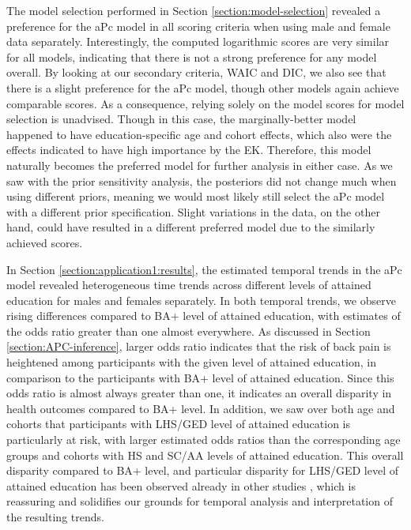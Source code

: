 \vspace{-0.2cm}
The model selection performed in Section \ref{section:model-selection} revealed a preference for the aPc model in all scoring criteria when using male and female data separately. Interestingly, the computed logarithmic scores are very similar for all models, indicating that there is not a strong preference for any model overall. By looking at our secondary criteria, WAIC and DIC, we also see that there is a slight preference for the aPc model, though other models again achieve comparable scores. As a consequence, relying solely on the model scores for model selection is unadvised. Though in this case, the marginally-better model happened to have education-specific age and cohort effects, which also were the effects indicated to have high importance by the EK. Therefore, this model naturally becomes the preferred model for further analysis in either case. As we saw with the prior sensitivity analysis, the posteriors did not change much when using different priors, meaning we would most likely still select the aPc model with a different prior specification. Slight variations in the data, on the other hand, could have resulted in a different preferred model due to the similarly achieved scores. 

\vspace{-0.2cm}
In Section \ref{section:application1:results}, the estimated temporal trends in the aPc model revealed heterogeneous time trends across different levels of attained education for males and females separately. In both temporal trends, we observe rising differences compared to BA+ level of attained education, with estimates of the odds ratio greater than one almost everywhere. As discussed in Section \ref{section:APC-inference}, larger odds ratio indicates that the risk of back pain is heightened among participants with the given level of attained education, in comparison to the participants with BA+ level of attained education. Since this odds ratio is almost always greater than one, it indicates an overall disparity in health outcomes compared to BA+ level. In addition, we saw over both age and cohorts that participants with LHS/GED level of attained education is particularly at risk, with larger estimated odds ratios than the corresponding age groups and cohorts with HS and SC/AA levels of attained education. This overall disparity compared to BA+ level, and particular disparity for LHS/GED level of attained education has been observed already in other studies \citep{GEDdisparity}, which is reassuring and solidifies our grounds for temporal analysis and interpretation of the resulting trends.

